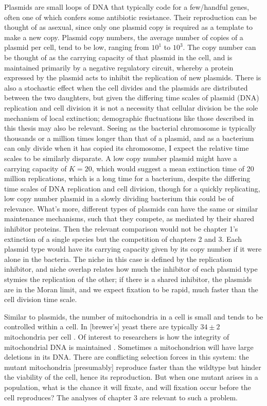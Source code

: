 Plasmids are small loops of DNA that typically code for a few/handful genes, often one of which confers some antibiotic resistance. \cite{that bio textbook - Wilson?}
Their reproduction can be thought of as asexual, since only one plasmid copy is required as a template to make a new copy. 
Plasmid copy numbers, the average number of copies of a plasmid per cell, tend to be low, ranging from $10^1$ to $10^3$. 
The copy number can be thought of as the carrying capacity of that plasmid in the cell, and is maintained primarily by a negative regulatory circuit, whereby a protein expressed by the plasmid acts to inhibit the replication of new plasmids. 
There is also a stochastic effect when the cell divides and the plasmids are distributed between the two daughters, but given the differing time scales of plasmid (DNA) replication and cell division it is not a necessity that cellular division be the sole mechanism of local extinction; demographic fluctuations like those described in this thesis may also be relevant. 
Seeing as the bacterial chromosome is typically thousands or a million times longer than that of a plasmid, and as a bacterium can only divide when it has copied its chromosome, I expect the relative time scales to be similarly disparate. 
A low copy number plasmid might have a carrying capacity of $K=20$, which would suggest a mean extinction time of 20 million replications, which is a long time for a bacterium, despite the differing time scales of DNA replication and cell division, though for a quickly replicating, low copy number plasmid in a slowly dividing bacterium this could be of relevance. 
What's more, different types of plasmids can have the same or similar maintenance mechanisms, such that they compete, as mediated by their shared inhibitor proteins. 
Then the relevant comparison would not be chapter 1's extinction of a single species but the competition of chapters 2 and 3. 
Each plasmid type would have its carrying capacity given by its copy number if it were alone in the bacteria. 
The niche in this case is defined by the replication inhibitor, and niche overlap relates how much the inhibitor of each plasmid type stymies the replication of the other; if there is a shared inhibitor, the plasmids are in the Moran limit, and we expect fixation to be rapid, much faster than the cell division time scale. 

Similar to plasmids, the number of mitochondria in a cell is small and tends to be controlled within a cell. 
In [brewer's] yeast there are typically $34\pm 2$ mitochondria per cell \cite{bionumbers}. 
Of interest to researchers is how the integrity of mitochondrial DNA is maintained \cite{Nunn}. 
Sometimes a mitochondrion will have large deletions in its DNA. 
There are conflicting selection forces in this system: the mutant mitochondria [presumably] reproduce faster than the wildtype but hinder the viability of the cell, hence its reproduction. 
But when one mutant arises in a population, what is the chance it will fixate, and will fixation occur before the cell reproduces? 
The analyses of chapter 3 are relevant to such a problem. 

